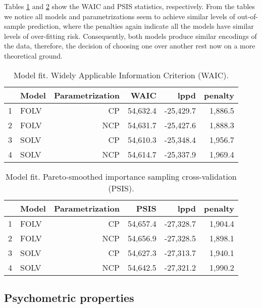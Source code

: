 Tables \ref{tab:model_fit1} and \ref{tab:model_fit2} show the WAIC and PSIS statistics, respectively. From the tables we notice all models and parametrizations seem to achieve similar levels of out-of-sample prediction, where the penalties again indicate all the models have similar levels of over-fitting risk. Consequently, both models produce similar encodings of the data, therefore, the decision of choosing one over another rest now on a more theoretical ground.
%
\begin{table}[H]
	\centering
	\begin{tabular}{rlrrrr}
		\hline
		& Model & Parametrization & WAIC & lppd & penalty \\  
		\hline\hline
		1 & FOLV & CP &  54,632.4 & -25,429.7 & 1,886.5 \\ 
		2 & FOLV & NCP & 54,631.7 & -25,427.6 & 1,888.3 \\
		\hline
	 	3 & SOLV & CP &  54,610.3 & -25,348.4 & 1,956.7 \\  
		4 & SOLV & NCP & 54,614.7 & -25,337.9 & 1,969.4 \\ 
		\hline
	\end{tabular}
	\caption[Model fit. Widely Applicable Information Criterion (WAIC).]%
	{Model fit. Widely Applicable Information Criterion (WAIC).}
	\label{tab:model_fit1}
\end{table}
%
\begin{table}[H]
	\centering
	\begin{tabular}{rlrrrr}
		\hline
		& Model & Parametrization & PSIS & lppd & penalty \\  
		\hline\hline
		1 & FOLV & CP &  54,657.4 & -27,328.7 & 1,904.4 \\ 
		2 & FOLV & NCP & 54,656.9 & -27,328.5 & 1,898.1  \\
		\hline
		3 & SOLV & CP &  54,627.3 & -27,313.7 & 1,940.1 \\  
		4 & SOLV & NCP & 54,642.5 & -27,321.2 & 1,990.2 \\ 
		\hline
	\end{tabular}
	\caption[Model fit. Pareto-smoothed importance sampling cross-validation (PSIS).]%
	{Model fit. Pareto-smoothed importance sampling cross-validation (PSIS).}
	\label{tab:model_fit2}
\end{table} 



\subsection{Psychometric properties}

